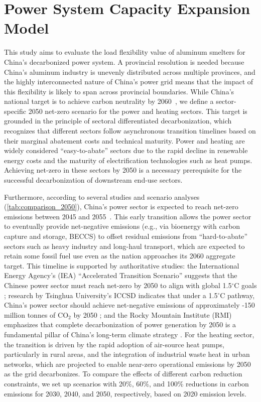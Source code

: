 \documentclass[preprint,12pt]{elsarticle}
\begin{document}
\section{Power System Capacity Expansion Model}
This study aims to evaluate the load flexibility value of aluminum smelters for China's decarbonized power system. A provincial resolution is needed because China's aluminum industry is unevenly distributed across multiple provinces, and the highly interconnected nature of China's power grid means that the impact of this flexibility is likely to span across provincial boundaries. While China's national target is to achieve carbon neutrality by 2060~\citep{yang_chinas_2024}, we define a sector-specific 2050 net-zero scenario for the power and heating sectors. This target is grounded in the principle of sectoral differentiated decarbonization, which recognizes that different sectors follow asynchronous transition timelines based on their marginal abatement costs and technical maturity. Power and heating are widely considered ``easy-to-abate'' sectors due to the rapid decline in renewable energy costs and the maturity of electrification technologies such as heat pumps. Achieving net-zero in these sectors by 2050 is a necessary prerequisite for the successful decarbonization of downstream end-use sectors. 

Furthermore, according to several studies and scenario analyses (\ref{tab:comparison_2050}), China's power sector is expected to reach net-zero emissions between 2045 and 2055~\citep{liu_chinas_2025}. This early transition allows the power sector to eventually provide net-negative emissions (e.g., via bioenergy with carbon capture and storage, BECCS) to offset residual emissions from ``hard-to-abate'' sectors such as heavy industry and long-haul transport, which are expected to retain some fossil fuel use even as the nation approaches its 2060 aggregate target. This timeline is supported by authoritative studies: the International Energy Agency's (IEA) ``Accelerated Transition Scenario'' suggests that the Chinese power sector must reach net-zero by 2050 to align with global 1.5$^\circ$C goals \citep{iea_roadmap_2021}; research by Tsinghua University's ICCSD indicates that under a 1.5$^\circ$C pathway, China's power sector should achieve net-negative emissions of approximately -150 million tonnes of CO$_2$ by 2050 \citep{tsinghua_iccsd_2020}; and the Rocky Mountain Institute (RMI) emphasizes that complete decarbonization of power generation by 2050 is a fundamental pillar of China's long-term climate strategy \citep{rmi_china_2050}. For the heating sector, the transition is driven by the rapid adoption of air-source heat pumps, particularly in rural areas, and the integration of industrial waste heat in urban networks, which are projected to enable near-zero operational emissions by 2050 as the grid decarbonizes. To compare the effects of different carbon reduction constraints, we set up scenarios with 20\%, 60\%, and 100\% reductions in carbon emissions for 2030, 2040, and 2050, respectively, based on 2020 emission levels. 
\end{document}
